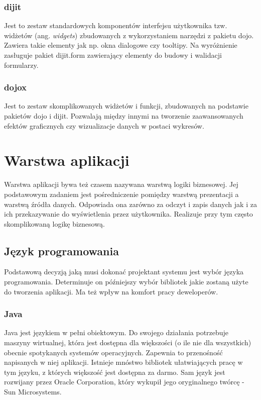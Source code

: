 \subsubsection[dijit][dijit]{dijit}
Jest to zestaw standardowych komponentów interfejsu użytkownika tzw. widżetów (ang. \textit{widgets}) zbudowanych z wykorzystaniem narzędzi z pakietu dojo. Zawiera takie elementy jak np. okna dialogowe czy tooltipy. Na wyróżnienie zasługuje pakiet dijit.form zawierający elementy do budowy i walidacji formularzy.
 
\subsubsection[dojox][dojox]{dojox}
Jest to zestaw skomplikowanych widżetów i funkcji, zbudowanych na podstawie pakietów dojo i dijit. Pozwalają między innymi na tworzenie zaawansowanych efektów graficznych czy wizualizacje danych w postaci wykresów.
 
\section[Warstwa aplikacji][Warstwa aplikacji]{Warstwa aplikacji}
Warstwa aplikacji bywa też czasem nazywana warstwą logiki biznesowej. Jej podstawowym zadaniem jest pośredniczenie pomiędzy warstwą prezentacji a warstwą źródła danych. Odpowiada ona zarówno za odczyt i zapis danych jak i za ich przekazywanie do wyświetlenia przez użytkownika. Realizuje przy tym często skomplikowaną logikę biznesową.

\subsection[Język programowania][Język programowania]{Język programowania}
Podstawową decyzją jaką musi dokonać projektant systemu jest wybór języka programowania. Determinuje on późniejszy wybór bibliotek jakie zostaną użyte do tworzenia aplikacji. Ma też wpływ na komfort pracy deweloperów.

\subsubsection{Java}
Java jest językiem w pełni obiektowym. Do swojego działania potrzebuje maszyny wirtualnej, która jest dostępna dla większości (o ile nie dla wszystkich) obecnie spotykanych systemów operacyjnych. Zapewnia to przenośność napisanych w niej aplikacji. Istnieje mnóstwo bibliotek ułatwiających pracę w tym języku, z których większość jest dostępna za darmo. Sam język jest rozwijany przez Oracle Corporation, który wykupił jego oryginalnego twórcę - Sun Microsystems.

